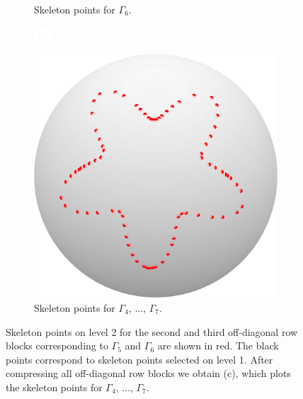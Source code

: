 \documentclass{sfuthesis}
\begin{document}
\begin{figure}[h]
\begin{subfigure}[b]{0.24\textwidth}
    		\caption{Skeleton points for $\Gamma_{6}$.} 
     \end{subfigure}
     \hspace{1cm}
      \begin{subfigure}[t]{0.18\textwidth}
      		\includegraphics[width=0.7cm]{dots2}
      \end{subfigure}
      \hspace{-0.8cm}
      \begin{subfigure}[b]{0.24\textwidth}
      \captionsetup{justification=centering}
      		\includegraphics[width=\textwidth]{BFRecLev2SkelAll}
    		\caption{Skeleton points for $\Gamma_4$, ..., $\Gamma_{7}$.} 
        \end{subfigure}
    	\caption{Skeleton points on level 2 for the second and third off-diagonal row blocks corresponding to $\Gamma_5$ and $\Gamma_{6}$ are shown in red. The black points correspond to skeleton points selected on level 1. After compressing all off-diagonal row blocks we obtain (c), which plots the skeleton points for $\Gamma_4$, ..., $\Gamma_{7}$. }
     	\label{fig: BFRecLev2Skeleton}
\end{figure}
\end{document}
